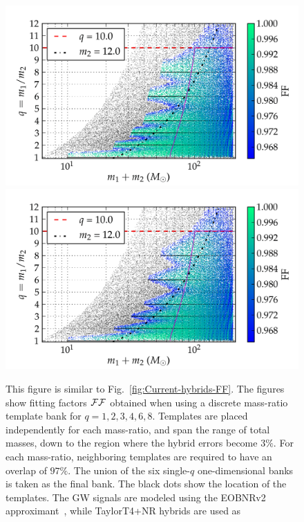 \begin{figure}
\begin{center}
\includegraphics[width=\columnwidth]{figures/nrhybbank/bank_26022013_02_hybrids_mtot200_logMq_NOhybMM-tiny.png}
\includegraphics[width=\columnwidth]{figures/nrhybbank/bank_26022013_02_hybrids_mtot200_logMq_hybMM-tiny.png}
\caption{\label{fig:Current-real-hybrids-FF}This figure is similar to 
  Fig.~\ref{fig:Current-hybrids-FF}. The figures show fitting
  factors $\mathcal{FF}$ obtained when using a discrete mass-ratio template bank for
  $q=1,2,3,4,6,8$. Templates are placed independently for each mass-ratio, and 
  span the range of total masses, down to the region where the hybrid errors
  become $3\%$. For each mass-ratio, neighboring templates are 
  required to have an overlap of $97\%$. The union of the six single-$q$ 
  one-dimensional banks is taken as the final bank. The black dots show the 
  location of the templates. The GW signals are modeled using the EOBNRv2
  approximant~\cite{BuonannoEOBv2Main}, while TaylorT4+NR hybrids are used as
}
\end{center}
\end{figure}
